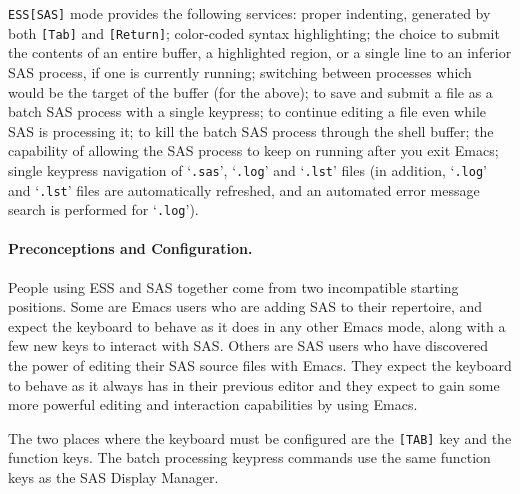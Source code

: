 \documentclass{article}
\newcommand{\stexttt}[1]{{\small\texttt{#1}}}
\newcommand{\file}[1]{`\stexttt{#1}'}
\begin{document}
\stexttt{ESS[SAS]} mode provides the following services: proper indenting, 
generated by both
\stexttt{[Tab]} and \stexttt{[Return]}; color-coded syntax
highlighting; the choice to submit the contents of an entire buffer, a
highlighted region, or a single line to an inferior SAS process, if
one is currently running; switching between processes which
would be the target of the buffer (for the above); to save and
submit a file as a batch SAS process with a single keypress; 
to continue editing a file even while SAS is processing it; to
kill the batch SAS process through the shell buffer;
the capability of allowing the SAS process to keep on running after
you exit Emacs; single keypress navigation of \file{.sas}, \file{.log}
and \file{.lst} files (in addition, \file{.log} and \file{.lst} files are
automatically refreshed, and an automated error message search is performed
for \file{.log}).


\paragraph{Preconceptions and Configuration.}

People using ESS and SAS together come from two incompatible starting
positions.  Some are Emacs users who are adding SAS to their
repertoire, and expect the keyboard to behave as it does in any other
Emacs mode, along with a few new keys to interact with SAS.  Others
are SAS users who have discovered the power of editing their SAS
source files with Emacs.  They expect the keyboard to behave as it
always has in their previous editor and they expect to gain some more
powerful editing and interaction capabilities by using Emacs.

The two places where the keyboard must be configured are the
\texttt{[TAB]} key and the function keys.  The batch processing
keypress commands use the same function keys as the SAS Display
Manager.

\end{document}
